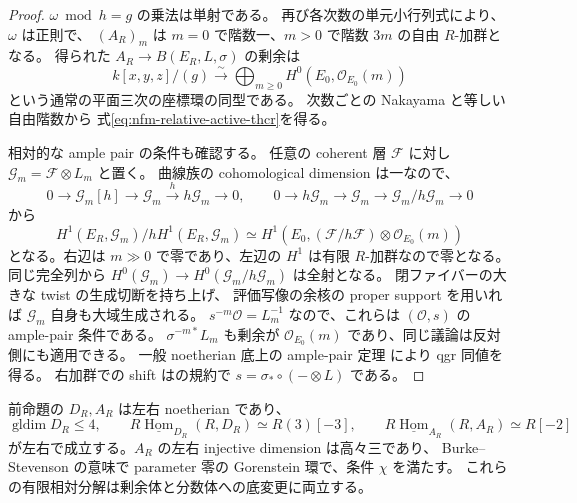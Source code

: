 \begin{proof}
$\omega\bmod h=g$ の乗法は単射である。
再び各次数の単元小行列式により、$\omega$ は正則で、
$(A_R)_m$ は $m=0$ で階数一、$m>0$ で階数 $3m$ の自由 $R$-加群となる。
得られた $A_R\to B(E_R,L,\sigma)$ の剰余は
\[
 k[x,y,z]/(g)\xrightarrow{\sim}
 \bigoplus_{m\ge0}H^0(E_0,\mathcal O_{E_0}(m))
\]
という通常の平面三次の座標環の同型である。
次数ごとの Nakayama と等しい自由階数から
式\eqref{eq:nfm-relative-active-thcr}を得る。

相対的な ample pair の条件も確認する。
任意の coherent 層 $\mathcal F$ に対し $\mathcal G_m=\mathcal F\otimes L_m$ と置く。
曲線族の cohomological dimension は一なので、
\[
 0\to\mathcal G_m[h]\to\mathcal G_m\xrightarrow h h\mathcal G_m\to0,
 \qquad
 0\to h\mathcal G_m\to\mathcal G_m\to\mathcal G_m/h\mathcal G_m\to0
\]
から
\[
 H^1(E_R,\mathcal G_m)/hH^1(E_R,\mathcal G_m)
 \simeq H^1(E_0,(\mathcal F/h\mathcal F)\otimes\mathcal O_{E_0}(m))
\]
となる。右辺は $m\gg0$ で零であり、左辺の $H^1$ は有限 $R$-加群なので零となる。
同じ完全列から $H^0(\mathcal G_m)\to H^0(\mathcal G_m/h\mathcal G_m)$ は全射となる。
閉ファイバーの大きな twist の生成切断を持ち上げ、
評価写像の余核の proper support を用いれば $\mathcal G_m$ 自身も大域生成される。
$s^{-m}\mathcal O=L_m^{-1}$ なので、これらは $(\mathcal O,s)$ の ample-pair 条件である。
$\sigma^{-m*}L_m$ も剰余が $\mathcal O_{E_0}(m)$ であり、同じ議論は反対側にも適用できる。
一般 noetherian 底上の ample-pair 定理
\cite[Proposition~7.2 and Lemma~7.6]{NFMKeelerAmple}により qgr 同値を得る。
右加群での shift は\cite[Section~3, equation~(3.1)]{NFMStaffordVdB}の規約で
$s=\sigma_*\circ(-\otimes L)$ である。
\end{proof}

\begin{lemma}
\label{lem:nfm-active-dvr-gorenstein}
前命題の $D_R,A_R$ は左右 noetherian であり、
\[
 \operatorname{gldim}D_R\le4,\qquad
 R\underline{\operatorname{Hom}}_{D_R}(R,D_R)\simeq R(3)[-3],
 \qquad
 R\underline{\operatorname{Hom}}_{A_R}(R,A_R)\simeq R[-2]
\]
が左右で成立する。$A_R$ の左右 injective dimension は高々三であり、
Burke--Stevenson の意味で parameter 零の Gorenstein 環で、条件 $\chi$ を満たす。
これらの有限相対分解は剰余体と分数体への底変更に両立する。
\end{lemma}

